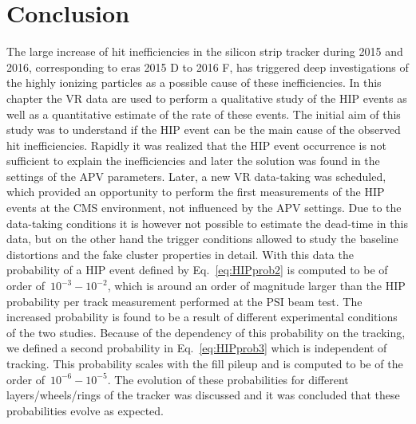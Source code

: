 \section{Conclusion}

The large increase of hit inefficiencies in the silicon strip tracker during 2015 and 2016, corresponding to eras 2015 D to 2016 F, has triggered deep investigations of the highly ionizing particles as a possible cause of these inefficiencies. In this chapter the VR data are used to perform a qualitative study of the HIP events as well as a quantitative estimate of the rate of these events. The initial aim of this study was to understand if the HIP event can be the main cause of the observed hit inefficiencies. Rapidly it was realized that the HIP event occurrence is not sufficient to explain the inefficiencies and later the solution was found in the settings of the APV parameters. Later, a new VR data-taking was scheduled, which provided an opportunity to perform the first measurements of the HIP events at the CMS environment, not influenced by the APV settings. Due to the data-taking conditions it is however not possible to estimate the dead-time in this data, but on the other hand the trigger conditions allowed to study the baseline distortions and the fake cluster properties in detail. With this data the probability of a HIP event defined by Eq.~\ref{eq:HIPprob2} is computed to be of order of~$10^{-3}-10^{-2}$, which is around an order of magnitude larger than the HIP probability per track measurement performed at the PSI beam test. The increased probability is found to be a result of different experimental conditions of the two studies. Because of the dependency of this probability on the tracking, we defined a second probability in Eq.~\ref{eq:HIPprob3} which is independent of tracking. This probability scales with the fill pileup and is computed to be of the order of~$10^{-6}-10^{-5}$. The evolution of these probabilities for different layers/wheels/rings of the tracker was discussed and it was concluded that these probabilities evolve as expected. %

\newpage

